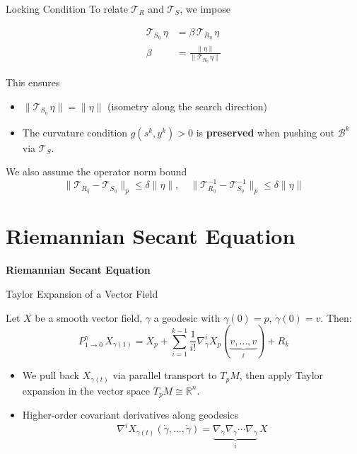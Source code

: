 \documentclass[10pt,aspectratio=169]{beamer}
\newcommand{\RR}{\mathbb{R}}
\newcommand{\VT}{\mathcal{T}}
\begin{document}
\begin{frame}{Locking Condition}
To relate $\VT_R$ and $\VT_S$, we impose
\begin{definition}
\begin{align*}
    \VT_{S_\eta}\,\eta &= \beta\,\VT_{R_\eta}\,\eta\\
    \beta &= \frac{\|\eta\|}{\|\VT_{R_\eta}\,\eta\|}
\end{align*}
\end{definition}
This ensures
\begin{itemize}
    \item $\|\VT_{S_\eta}\,\eta\| = \|\eta\|$ (isometry along the search direction)
    \item The curvature condition $g(s^k,y^k)>0$ is \textbf{preserved} when pushing out $\mathcal{B}^k$ via $\VT_S$.
\end{itemize}
\bigskip
We also assume the operator norm bound
$$\|\VT_{R_\eta} - \VT_{S_\eta}\|_p \leq \delta\|\eta\|, \quad \|\VT_{R_\eta}^{-1} - \VT_{S_\eta}^{-1}\|_p \leq \delta\|\eta\|$$
\end{frame}

\section{Riemannian Secant Equation}

\begin{frame}{}
\centering
\vfill
{\Huge\bfseries Riemannian Secant Equation}
\vfill
\end{frame}

\begin{frame}{Taylor Expansion of a Vector Field}
\begin{theorem}
Let $X$ be a smooth vector field, $\gamma$ a geodesic with $\gamma(0)=p$, $\dot\gamma(0)=v$. Then:
$$P_{1\to 0}^\gamma\,X_{\gamma(1)} = X_p + \sum_{i=1}^{k-1}\frac{1}{i!}\nabla^i_{\dot\gamma}X_p(\underbrace{v,\ldots,v}_{i}) + R_k$$
\end{theorem}
\begin{itemize}
    \item We pull back $X_{\gamma(t)}$ via parallel transport to $T_pM$, then apply Taylor expansion in the vector space $T_pM\cong\RR^n$.
    \item Higher-order covariant derivatives along geodesics
    $$\nabla^i X_{\gamma(t)}(\dot\gamma,\ldots,\dot\gamma) = \underbrace{\nabla_{\dot\gamma}\nabla_{\dot\gamma}\cdots\nabla_{\dot\gamma}}_{i}\,X$$
\end{itemize}
\end{frame}
\end{document}
